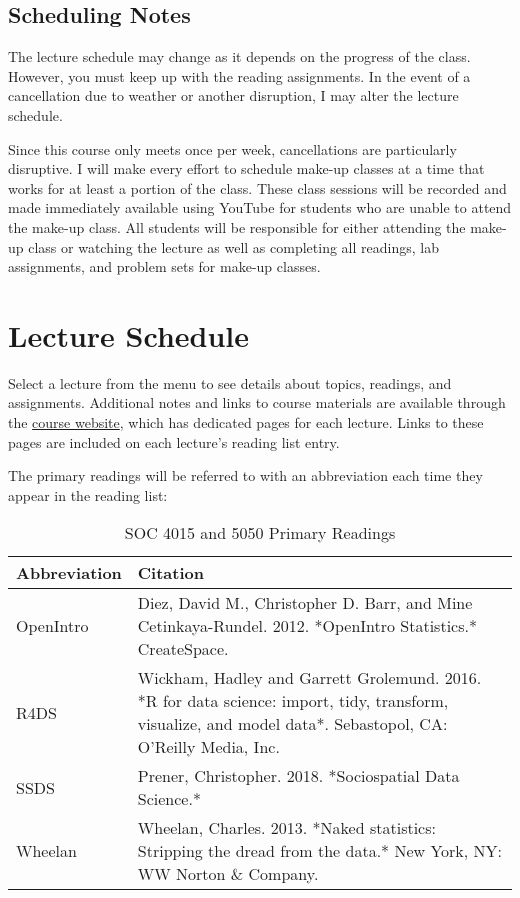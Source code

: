 \documentclass[]{book}
\theoremstyle{definition}
\theoremstyle{definition}
\theoremstyle{definition}
\theoremstyle{remark}
\begin{document}
\hypertarget{scheduling-notes}{%
\section{Scheduling Notes}\label{scheduling-notes}}

The lecture schedule may change as it depends on the progress of the
class. However, you must keep up with the reading assignments. In the
event of a cancellation due to weather or another disruption, I may
alter the lecture schedule.

Since this course only meets once per week, cancellations are
particularly disruptive. I will make every effort to schedule make-up
classes at a time that works for at least a portion of the class. These
class sessions will be recorded and made immediately available using
YouTube for students who are unable to attend the make-up class. All
students will be responsible for either attending the make-up class or
watching the lecture as well as completing all readings, lab
assignments, and problem sets for make-up classes.

\hypertarget{lecture-schedule}{%
\chapter{Lecture Schedule}\label{lecture-schedule}}

Select a lecture from the menu to see details about topics, readings,
and assignments. Additional notes and links to course materials are
available through the \href{https://slu-soc5050.github.io}{course
website}, which has dedicated pages for each lecture. Links to these
pages are included on each lecture's reading list entry.

The primary readings will be referred to with an abbreviation each time
they appear in the reading list:

\begin{table}

\caption{\label{tab:unnamed-chunk-1}SOC 4015 and 5050 Primary Readings}
\centering
\begin{tabular}[t]{ll}
\toprule
Abbreviation & Citation\\
\midrule
OpenIntro & Diez, David M., Christopher D. Barr, and Mine Cetinkaya-Rundel. 2012. *OpenIntro Statistics.* CreateSpace.\\
R4DS & Wickham, Hadley and Garrett Grolemund. 2016. *R for data science: import, tidy, transform, visualize, and model data*. Sebastopol, CA: O'Reilly Media, Inc.\\
SSDS & Prener, Christopher. 2018. *Sociospatial Data Science.*\\
Wheelan & Wheelan, Charles. 2013. *Naked statistics: Stripping the dread from the data.* New York, NY: WW Norton \& Company.\\
\bottomrule
\end{tabular}
\end{table}
\end{document}
